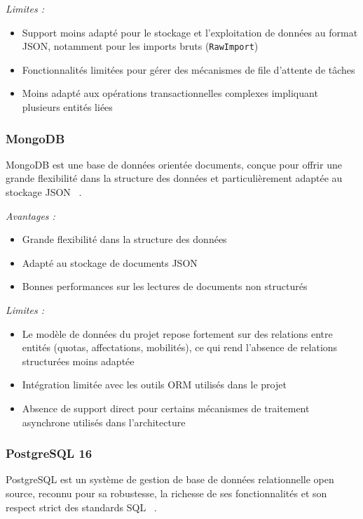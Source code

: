 \textit{Limites :}
\begin{itemize}
  \item Support moins adapté pour le stockage et l'exploitation de données
        au format JSON, notamment pour les imports bruts (\texttt{RawImport})
  \item Fonctionnalités limitées pour gérer des mécanismes de file d'attente
        de tâches
  \item Moins adapté aux opérations transactionnelles complexes impliquant
        plusieurs entités liées
\end{itemize}

\subsubsection{MongoDB}

MongoDB est une base de données orientée documents, conçue pour offrir
une grande flexibilité dans la structure des données et particulièrement
adaptée au stockage JSON ~\cite{mongodb_dev}.

\textit{Avantages :}
\begin{itemize}
  \item Grande flexibilité dans la structure des données
  \item Adapté au stockage de documents JSON
  \item Bonnes performances sur les lectures de documents non structurés
\end{itemize}

\textit{Limites :}
\begin{itemize}
  \item Le modèle de données du projet repose fortement sur des relations
        entre entités (quotas, affectations, mobilités), ce qui rend
        l'absence de relations structurées moins adaptée
  \item Intégration limitée avec les outils ORM utilisés dans le projet
  \item Absence de support direct pour certains mécanismes de traitement
        asynchrone utilisés dans l'architecture
\end{itemize}

\subsubsection{PostgreSQL 16}

PostgreSQL est un système de gestion de base de données relationnelle
open source, reconnu pour sa robustesse, la richesse de ses fonctionnalités
et son respect strict des standards SQL ~\cite{postgresql_dev}.

